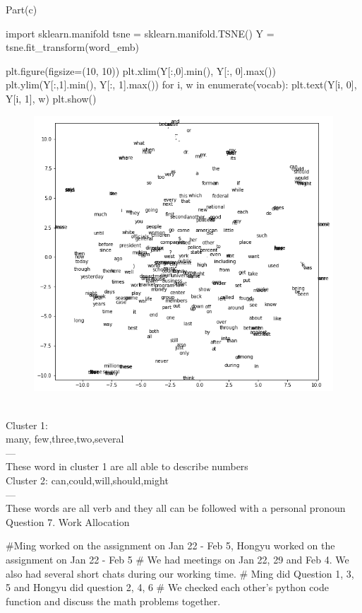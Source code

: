 \documentclass[12pt]{article}
\begin{document}
Part(c)\\
\begin{python}
import sklearn.manifold
tsne = sklearn.manifold.TSNE()
Y = tsne.fit_transform(word_emb)

plt.figure(figsize=(10, 10))
plt.xlim(Y[:,0].min(), Y[:, 0].max())
plt.ylim(Y[:,1].min(), Y[:, 1].max())
for i, w in enumerate(vocab):
    plt.text(Y[i, 0], Y[i, 1], w)
plt.show()
\end{python}
\begin{figure}[H]
    \centering
    \includegraphics[width=150mm,scale=1]{6c}\
\end{figure}
Cluster 1:\\
many, few,three,two,several\\
---\\
These word in cluster 1 are all able to describe numbers\\
Cluster 2: can,could,will,should,might\\
---\\
These words are all verb and they all can be followed with a personal pronoun\\

Question 7. Work Allocation\\
\begin{python}
#Ming worked on the assignment on Jan 22 - Feb 5, Hongyu worked on the assignment on Jan 22 - Feb 5
# We had meetings on Jan 22, 29 and Feb 4. We also had several short chats during our working time.  
# Ming did Question 1, 3, 5 and Hongyu did question 2, 4, 6
# We checked each other's python code function and discuss the math problems together.
\end{python}
\end{document}
